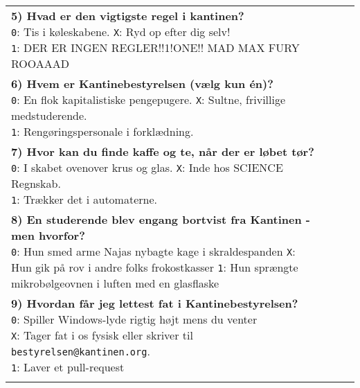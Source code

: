 \documentclass[a4paper]{article}
\begin{document}
\begin{center}
\begin{tabular}{|p{12cm}|p{0.2cm}|p{0.2cm}|p{0.2cm}|}
{} & & & \\\hline
\parbox{12cm}{
  \vspace{0.2cm}
  \textbf{5) Hvad er den vigtigste regel i kantinen?} \\
  \texttt{0}: Tis i køleskabene. \quad
  \texttt{X}: Ryd op efter dig selv! \\
  \texttt{1}: DER ER INGEN REGLER!!1!ONE!!  MAD MAX FURY ROOAAAD
  \vspace{0.1cm}
} & & & \\\hline
\parbox{12cm}{
  \vspace{0.2cm}
  \textbf{6) Hvem er Kantinebestyrelsen (vælg kun én)?} \\
  \texttt{0}: En flok kapitalistiske pengepugere. \quad
  \texttt{X}: Sultne, frivillige medstuderende. \\
  \texttt{1}: Rengøringspersonale i forklædning.
  \vspace{0.1cm}
} & & & \\\hline
\parbox{12cm}{
  \vspace{0.2cm}
  \textbf{7) Hvor kan du finde kaffe og te, når der er løbet tør?} \\
  \texttt{0}: I skabet ovenover krus og glas. \quad
  \texttt{X}: Inde hos SCIENCE Regnskab. \\
  \texttt{1}: Trækker det i automaterne.
  \vspace{0.1cm}
} & & & \\\hline
\parbox{12cm}{
  \vspace{0.2cm}
  \textbf{8) En studerende blev engang bortvist fra Kantinen - men hvorfor?} \\
  \texttt{0}: Hun smed arme Najas nybagte kage i skraldespanden \quad
  \texttt{X}: Hun gik på rov i andre folks frokostkasser \quad
  \texttt{1}: Hun sprængte mikrobølgeovnen i luften med en glasflaske
  \vspace{0.1cm}
} & & & \\\hline
\parbox{12cm}{
  \vspace{0.2cm}
  \textbf{9) Hvordan får jeg lettest fat i Kantinebestyrelsen?} \\
  \texttt{0}: Spiller Windows-lyde rigtig højt mens du venter \quad \\
  \texttt{X}: Tager fat i os fysisk eller skriver til \texttt{bestyrelsen@kantinen.org}. \\
  \texttt{1}: Laver et pull-request
  \vspace{0.1cm}
} & & & \\\hline
\parbox{12cm}{
  \vspace{0.2cm}
}
\end{tabular}
\end{center}
\end{document}
